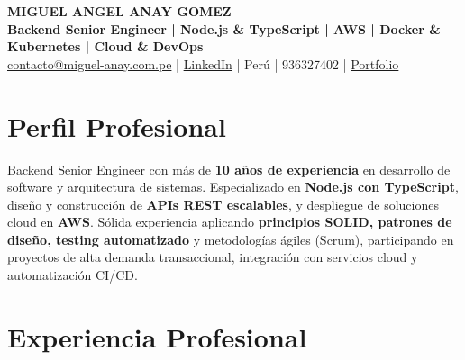 \documentclass[11pt,a4paper]{article}
\begin{document}
\begin{center}
{\Large \textbf{MIGUEL ANGEL ANAY GOMEZ}}\\
\textbf{Backend Senior Engineer | Node.js \& TypeScript | AWS | Docker \& Kubernetes | Cloud \& DevOps}\\
\vspace{4pt}
\href{mailto:contacto@miguel-anay.nom.pe}{contacto@miguel-anay.com.pe} |
\href{https://www.linkedin.com/in/miguel-anay}{LinkedIn} |
Perú |
936327402 |
\href{https://portfolio.miguel-anay.nom.pe}{Portfolio}
\end{center}

\vspace{6pt}

\section*{Perfil Profesional}

Backend Senior Engineer con más de \textbf{10 años de experiencia} en desarrollo de software y arquitectura de sistemas.  
Especializado en \textbf{Node.js con TypeScript}, diseño y construcción de \textbf{APIs REST escalables}, y despliegue de soluciones cloud en \textbf{AWS}.  
Sólida experiencia aplicando \textbf{principios SOLID, patrones de diseño, testing automatizado} y metodologías ágiles (Scrum), participando en proyectos de alta demanda transaccional, integración con servicios cloud y automatización CI/CD.

\vspace{6pt}

\section*{Experiencia Profesional}
\end{document}
